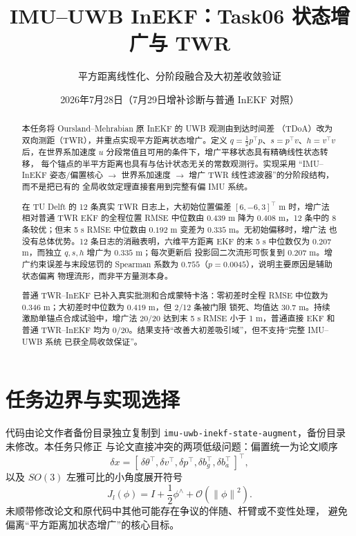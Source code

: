 \documentclass[11pt,a4paper]{ctexart}
\title{IMU--UWB InEKF：Task06 状态增广与 TWR}
\author{平方距离线性化、分阶段融合及大初差收敛验证}
\date{2026年7月28日（7月29日增补诊断与普通 InEKF 对照）}
\newcommand{\norm}[1]{\left\lVert #1\right\rVert}
\begin{document}
\pagestyle{plain}
\maketitle

\begin{abstract}
本任务将 Oursland--Mehrabian 原 InEKF 的 UWB 观测由到达时间差
（TDoA）改为双向测距（TWR），并重点实现平方距离状态增广。定义
$q=\tfrac12p^\top p$、$s=p^\top v$、$h=v^\top v$ 后，在世界系加速度
$u$ 分段常值且可用的条件下，增广平移状态具有精确线性状态转移，
每个锚点的半平方距离也具有与估计状态无关的常数观测行。实现采用
“IMU--InEKF 姿态/偏置核心 $\rightarrow$ 世界系加速度
$\rightarrow$ 增广 TWR 线性滤波器”的分阶段结构，而不是把已有的
全局收敛定理直接套用到完整有偏 IMU 系统。

在 TU Delft 的 12 条真实 TWR 日志上，大初始位置偏差
$[6,-6,3]^\top$ m 时，增广法相对普通 TWR EKF 的全程位置 RMSE
中位数由 $0.439$ m 降为 $0.408$ m，12 条中的 8 条较优；但末 5 s
RMSE 中位数由 $0.192$ m 变差为 $0.335$ m。无初始偏移时，增广法
也没有总体优势。12 条日志的消融表明，六维平方距离 EKF 的末 5 s
中位数仅为 $0.207$ m，而独立 $q,s,h$ 增广为 $0.335$ m；每次更新后
投影回二次流形可恢复到 $0.207$ m。增广约束误差与末段惩罚的
Spearman 系数为 $0.755$（$p=0.0045$），说明主要原因是辅助状态偏离
物理流形，而非平方量测本身。

普通 TWR--InEKF 已补入真实批测和合成蒙特卡洛：零初差时全程 RMSE
中位数为 $0.346$ m；大初差时中位数为 $0.419$ m，但 2/12 条被门限
锁死、均值达 $30.7$ m。持续激励单锚点合成试验中，增广法 20/20
达到末 5 s RMSE 小于 1 m，普通直接 EKF 和普通 TWR--InEKF 均为
0/20。结果支持“改善大初差吸引域”，但不支持“完整 IMU--UWB 系统
已获全局收敛保证”。
\end{abstract}

\section{任务边界与实现选择}

代码由论文作者备份目录独立复制到
\texttt{imu-uwb-inekf-state-augment}，备份目录未修改。本任务只修正
与论文直接冲突的两项低级问题：偏置统一为论文顺序
\begin{equation}
 \delta x=
 [\,\delta\theta^\top,\delta v^\top,\delta p^\top,
    \delta b_g^\top,\delta b_a^\top\,]^\top ,
 \label{eq:bias-order}
\end{equation}
以及 $SO(3)$ 左雅可比的小角度展开符号
\begin{equation}
 J_l(\phi)=I+\frac12\phi^\wedge+\mathcal O(\norm{\phi}^2).
\end{equation}
未顺带修改论文和原代码中其他可能存在争议的伴随、杆臂或不变性处理，
避免偏离“平方距离加状态增广”的核心目标。
\end{document}
